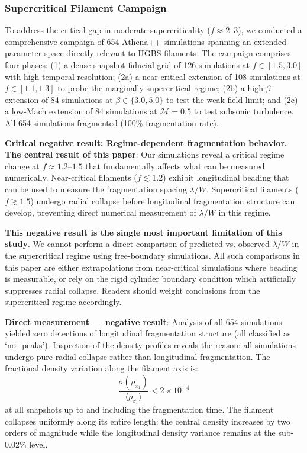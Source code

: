 \documentclass[twocolumn]{mnras}
\begin{document}
\subsubsection{Supercritical Filament Campaign}
\label{sec:supercrit}

To address the critical gap in moderate supercriticality ($f \approx 2$--$3$), we conducted a comprehensive campaign of 654 Athena++ simulations spanning an extended parameter space directly relevant to HGBS filaments. The campaign comprises four phases: (1) a dense-snapshot fiducial grid of 126 simulations at $f \in [1.5, 3.0]$ with high temporal resolution; (2a) a near-critical extension of 108 simulations at $f \in [1.1, 1.3]$ to probe the marginally supercritical regime; (2b) a high-$\beta$ extension of 84 simulations at $\beta \in \{3.0, 5.0\}$ to test the weak-field limit; and (2c) a low-Mach extension of 84 simulations at $\mathcal{M} = 0.5$ to test subsonic turbulence. All 654 simulations fragmented (100\% fragmentation rate).

\textbf{Critical negative result: Regime-dependent fragmentation behavior.}
\textbf{The central result of this paper}: Our simulations reveal a critical regime change at $f \approx 1.2$--$1.5$ that fundamentally affects what can be measured numerically. Near-critical filaments ($f \lesssim 1.2$) exhibit longitudinal beading that can be used to measure the fragmentation spacing $\lambda/W$. Supercritical filaments ($f \gtrsim 1.5$) undergo radial collapse before longitudinal fragmentation structure can develop, preventing direct numerical measurement of $\lambda/W$ in this regime.

\textbf{This negative result is the single most important limitation of this study}. We cannot perform a direct comparison of predicted vs. observed $\lambda/W$ in the supercritical regime using free-boundary simulations. All such comparisons in this paper are either extrapolations from near-critical simulations where beading is measurable, or rely on the rigid cylinder boundary condition which artificially suppresses radial collapse. Readers should weight conclusions from the supercritical regime accordingly.

\textbf{Direct measurement --- negative result}: Analysis of all 654 simulations yielded zero detections of longitudinal fragmentation structure (all classified as `no\_peaks'). Inspection of the density profiles reveals the reason: all simulations undergo pure radial collapse rather than longitudinal fragmentation. The fractional density variation along the filament axis is:
\begin{equation}
\frac{\sigma(\rho_{x_1})}{\langle \rho_{x_1} \rangle} < 2 \times 10^{-4}
\end{equation}
at all snapshots up to and including the fragmentation time. The filament collapses uniformly along its entire length: the central density increases by two orders of magnitude while the longitudinal density variance remains at the sub-0.02\% level.
\end{document}
